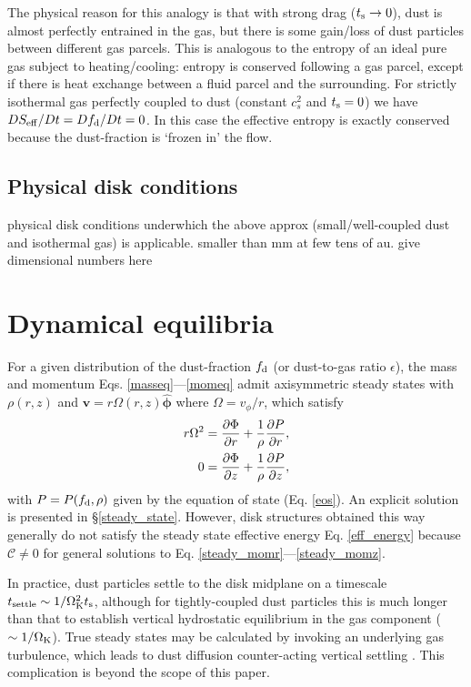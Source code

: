 The physical reason for this analogy is that with strong drag
($t_\mathrm{s}\to0$), dust is almost perfectly entrained in the gas, but
there is some gain/loss of dust particles between different  
gas parcels. This is analogous to the entropy of an ideal 
pure gas subject to heating/cooling: entropy is conserved following
a gas parcel, except if there is heat exchange between a fluid parcel and the
surrounding. For strictly isothermal gas perfectly coupled to dust
(constant $c_s^2$ and $t_\mathrm{s}=0$) we have 
$DS_\mathrm{eff}/ D t = Df_\mathrm{d}/D t=0$. In this case the effective 
entropy is exactly conserved because the dust-fraction is `frozen in' the
flow. 

{\bf
\subsection{Physical disk conditions}
physical disk conditions underwhich the above approx
(small/well-coupled dust and isothermal gas) is applicable. smaller
than mm at few tens of au. give dimensional numbers here
}

\section{Dynamical equilibria}\label{eqm}
 
For a given distribution of the dust-fraction $f_\mathrm{d}$ (or
dust-to-gas ratio $\epsilon$), the 
mass and momentum Eqs. \ref{masseq}---\ref{momeq} admit     
axisymmetric steady states with $\rho(r,z)$ and 
$\bm{v}=r\Omega(r,z)\hat{\bm{\phi}}$ where $\Omega = v_\phi/r$, which satisfy 
\begin{align}
  r\Omega^2 &= \frac{\partial \Phi}{\partial r} + \frac{1}{\rho}\frac{\partial P}{\partial
    r},\label{steady_momr}\\
  0 & = \frac{\partial\Phi}{\partial z} + \frac{1}{\rho}\frac{\partial P}{\partial z},\label{steady_momz}
\end{align}
with $P=P(f_\mathrm{d},\rho)$ given by the equation of state
(Eq. \ref{eos}). An explicit solution is presented in
\S\ref{steady_state}.  
However, disk structures obtained this way generally do not satisfy 
the steady state effective energy Eq. \ref{eff_energy} because
$\mathcal{C}\neq0$ for general solutions to
Eq. \ref{steady_momr}---\ref{steady_momz}. 

In practice, dust particles settle to the disk midplane on a timescale 
$t_\mathrm{settle}\sim 1/\Omega_{\rm K}^2t_\mathrm{s}$, although for tightly-coupled dust
particles this is much longer than that to establish vertical
hydrostatic equilibrium in the gas component ($\sim 1/\Omega_{\rm K}$).  
True steady states may be calculated by invoking an underlying gas
turbulence, which leads to dust diffusion counter-acting vertical
settling \citep{takeuchi02, youdin07}. This complication is beyond the
scope of this paper.  

